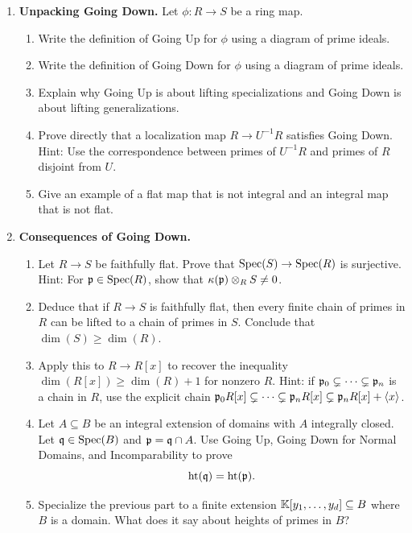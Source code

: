 \documentclass[12pt,reqno]{amsart}
\begin{document}
\begin{enumerate}[leftmargin=*, resume=problems]

\item \textbf{Unpacking Going Down.} Let $\phi:R\to S$ be a ring map.
\begin{enumerate}
    \item Write the definition of Going Up for $\phi$ using a diagram of prime ideals.
    \item Write the definition of Going Down for $\phi$ using a diagram of prime ideals.
    \item Explain why Going Up is about lifting specializations and Going Down is about lifting generalizations.
    \item Prove directly that a localization map $R\to U^{-1}R$ satisfies Going Down. Hint: Use the correspondence between primes of $U^{-1}R$ and primes of $R$ disjoint from $U$.
    \item Give an example of a flat map that is not integral and an integral map that is not flat.
\end{enumerate}

\item \textbf{Consequences of Going Down.} 
\begin{enumerate}
    \item Let $R\to S$ be faithfully flat. Prove that $\operatorname{Spec}(S)\to\operatorname{Spec}(R)$ is surjective. Hint: For $\mathfrak{p}\in\operatorname{Spec}(R)$, show that $\kappa(\mathfrak{p})\otimes_R S\neq 0$.
    \item Deduce that if $R\to S$ is faithfully flat, then every finite chain of primes in $R$ can be lifted to a chain of primes in $S$. Conclude that $\dim(S)\geq \dim(R)$.
    \item Apply this to $R\to R[x]$ to recover the inequality $\dim(R[x])\geq \dim(R)+1$ for nonzero $R$. Hint: if $\mathfrak{p}_0\subsetneq\cdots\subsetneq\mathfrak{p}_n$ is a chain in $R$, use the explicit chain $\mathfrak{p}_0R[x]\subsetneq\cdots\subsetneq\mathfrak{p}_nR[x]\subsetneq\mathfrak{p}_nR[x]+\langle x\rangle$.
    \item Let $A\subseteq B$ be an integral extension of domains with $A$ integrally closed. Let $\mathfrak{q}\in\operatorname{Spec}(B)$ and $\mathfrak{p}=\mathfrak{q}\cap A$. Use Going Up, Going Down for Normal Domains, and Incomparability to prove
    \[
    \operatorname{ht}(\mathfrak{q})=\operatorname{ht}(\mathfrak{p}).
    \]
    \item Specialize the previous part to a finite extension $\mathbb{K}[y_1,\ldots,y_d]\subseteq B$ where $B$ is a domain. What does it say about heights of primes in $B$?
\end{enumerate}

\end{enumerate}
\end{document}
